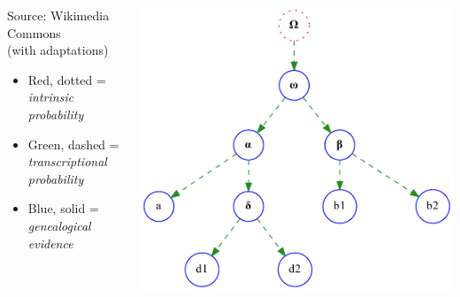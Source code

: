\documentclass[10pt]{beamer}
\begin{document}
\begin{frame}
\begin{columns}
\begin{column}{0.35\textwidth}
\begin{center}
{						\footnotesize Source: Wikimedia Commons\\
						(with adaptations)
					}
				\end{center}
				\vspace{0.5\baselineskip}
				\begin{itemize}
					\item Red, dotted = \emph{intrinsic probability}
					\item Green, dashed = \emph{transcriptional probability}
					\item Blue, solid = \emph{genealogical evidence}
				\end{itemize}
			\end{column}
			\begin{column}{0.65\textwidth}
				\includegraphics[width=\textwidth]{../img/stemma-evidence-overlay.pdf}
			\end{column}
		\end{columns}
	\end{frame}
\end{document}
